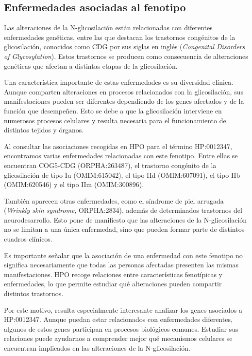 \subsection{Enfermedades asociadas al fenotipo}

Las alteraciones de la N-glicosilación  \cite{Peanne2018} están relacionadas con diferentes enfermedades genéticas, entre las que destacan los trastornos congénitos de la glicosilación, conocidos como CDG por sus siglas en inglés (\textit{Congenital Disorders of Glycosylation}). Estos trastornos se producen como consecuencia de alteraciones genéticas que afectan a distintas etapas de la glicosilación.

Una característica importante de estas enfermedades es su diversidad clínica. Aunque comparten alteraciones en procesos relacionados con la glicosilación, sus manifestaciones pueden ser diferentes dependiendo de los genes afectados y de la función que desempeñen. Esto se debe a que la glicosilación interviene en numerosos procesos celulares y resulta necesaria para el funcionamiento de distintos tejidos y órganos.

Al consultar las asociaciones recogidas en HPO para el término HP:0012347, encontramos varias enfermedades relacionadas con este fenotipo. Entre ellas se encuentran COG5-CDG (ORPHA:263487), el trastorno congénito de la glicosilación de tipo Iu (OMIM:615042), el tipo IId (OMIM:607091), el tipo IIb (OMIM:620546) y el tipo IIm (OMIM:300896).

También aparecen otras enfermedades, como el síndrome de piel arrugada (\textit{Wrinkly skin syndrome}, ORPHA:2834), además de determinados trastornos del neurodesarrollo. Esto pone de manifiesto que las alteraciones de la N-glicosilación no se limitan a una única enfermedad, sino que pueden formar parte de distintos cuadros clínicos.

Es importante señalar que la asociación de una enfermedad con este fenotipo no significa necesariamente que todas las personas afectadas presenten las mismas manifestaciones. HPO recoge relaciones entre características fenotípicas y enfermedades, lo que permite estudiar qué alteraciones pueden compartir distintos trastornos.

Por este motivo, resulta especialmente interesante analizar los genes asociados a HP:0012347. Aunque puedan estar relacionados con enfermedades diferentes, algunos de estos genes participan en procesos biológicos comunes. Estudiar sus relaciones puede ayudarnos a comprender mejor qué mecanismos celulares se encuentran implicados en las alteraciones de la N-glicosilación.

